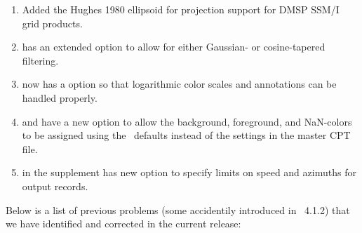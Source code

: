 \begin{enumerate}
\item Added the Hughes 1980 ellipsoid for projection support for DMSP SSM/I grid products.
\item {} has an extended  option to allow for either Gaussian- or
cosine-tapered filtering.
\item {} now has a  option so that logarithmic color scales and annotations
can be handled properly.
\item {} and  have a new  option to allow the background, foreground, and
NaN-colors to be assigned using the \GMT\ defaults instead of the settings in the master CPT file. 
\item {} in the  supplement has new option  to specify limits on
speed and azimuths for output records.
\end{enumerate}

Below is a list of previous problems (some accidentily introduced in \gmt\ 4.1.2)
that we have identified and corrected in the current release:

